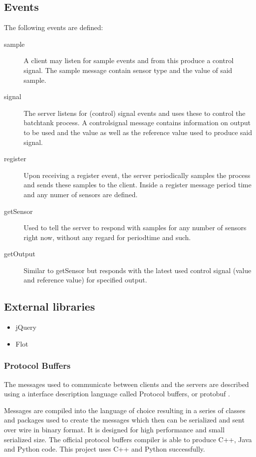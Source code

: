 \documentclass{article}
\begin{document}
\subsection{Events}
The following events are defined:

\begin{description}
\item[sample]
  A client may listen for sample events and from this produce a control
  signal. The sample message contain sensor type and the value of said
  sample.
\item[signal]
  The server listens for (control) signal events and uses these to
  control the batchtank process. A controlsignal message contains
  information on output to be used and the value as well as the
  reference value used to produce said signal.
\item[register]
  Upon receiving a register event, the server periodically samples the
  process and sends these samples to the client. Inside a register
  message period time and any numer of sensors are defined.
\item[getSensor]
  Used to tell the server to respond with samples for any number of
  sensors right now, without any regard for periodtime and such.
\item[getOutput]
  Similar to getSensor but responds with the latest used control signal
  (value and reference value) for specified output.
\end{description}

\subsection{External libraries}
\begin{itemize}
\item{jQuery}
\item{Flot}
\end{itemize}

\subsubsection{Protocol Buffers}
The messages used to communicate between clients and the servers are
described using a interface description language called Protocol
buffers, or protobuf \cite{protobuf}.

Messages are compiled into the language of choice resulting in a series
of classes and packages used to create the messages which then can be
serialized and sent over wire in binary format. It is designed for high
performance and small serialized size. The official protocol buffers
compiler is able to produce C++, Java and Python code. This project uses
C++ and Python successfully.
\end{document}
